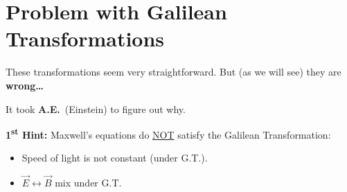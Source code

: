 \section*{Problem with Galilean Transformations}

These transformations seem very straightforward.
But (as we will see) they are \textbf{wrong\ldots}

It took \textbf{A.E.}\ (Einstein) to figure out why.

\begin{tcolorbox}
  \textbf{1\textsuperscript{st} Hint:} Maxwell's equations do \underline{NOT} satisfy the Galilean Transformation:
  \begin{itemize}
    \item Speed of light is not constant (under G.T.).
    \item $\vec{E} \leftrightarrow \vec{B}$ mix under G.T.
  \end{itemize}
\end{tcolorbox}


